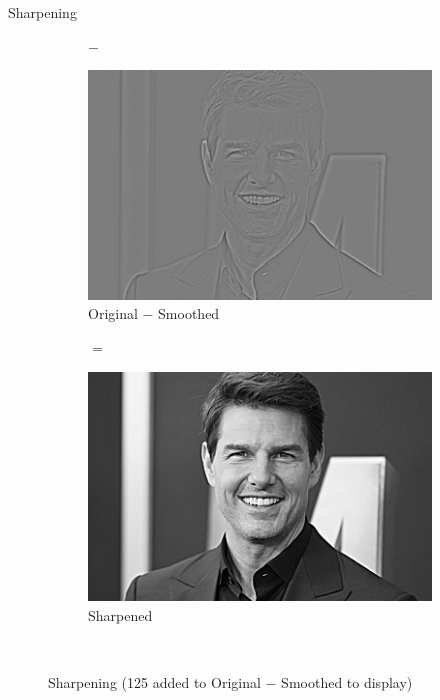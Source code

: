 \begin{frame}{Sharpening}
\begin{figure}
\begin{subfigure}[b]{0.25\textwidth}
        \end{subfigure}
        \begin{subfigure}[b]{0.05\textwidth}
            \centering
            $-$
            \vspace{2cm}
        \end{subfigure}
        \begin{subfigure}[b]{0.25\textwidth}
            \includegraphics[width=\textwidth]{./figures/sharpening_diff.jpg}
            \caption{Original $-$ Smoothed}
            \label{sfi:sharpening_diff_1}
        \end{subfigure}
        \begin{subfigure}[b]{0.05\textwidth}
            \centering
            $=$
            \vspace{2cm}
        \end{subfigure}
        \begin{subfigure}[b]{0.25\textwidth}
            \includegraphics[width=\textwidth]{./figures/sharpening_sharpened.jpg}
            \caption{Sharpened}
            \label{sfi:sharpening_sharpened}
        \end{subfigure}\\
        \caption{Sharpening (125 added to Original $-$ Smoothed to display)}\label{fi:effect_of_kernels}
    \end{figure}
\end{frame}


